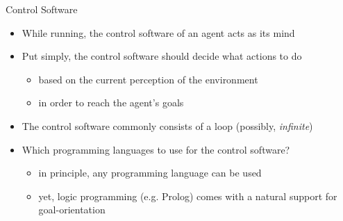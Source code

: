 \documentclass[presentation]{beamer}\mode<presentation>{\usetheme{AMSBolognaFC}}
\begin{document}
\begin{frame}{Control Software}
    \begin{itemize}
        \item While running, the control software of an agent acts as its mind
        
        \vfill

        \item Put simply, the control software should \alert{decide} what actions to do
        \begin{itemize}
            \item based on the current perception of the environment
            \item in order to reach the agent's goals
        \end{itemize}

        \vfill

        \item The control software commonly consists of a \alert{loop} (possibly, \emph{infinite})
        
        \vfill

        \item Which programming languages to use for the control software?
        \begin{itemize}
            \item in principle, any programming language can be used
            \item yet, logic programming (e.g. Prolog) comes with a natural support for \alert{goal-orientation}
        \end{itemize}
    \end{itemize}
\end{frame}
\end{document}

